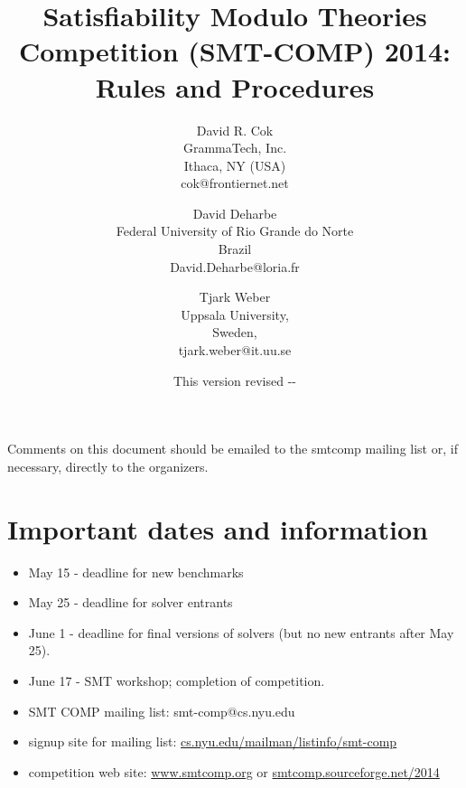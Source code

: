\documentclass[12pt]{article}
\begin{document}
\date{\small This version revised \the\year-\the\month-\the\day}

\title{Satisfiability Modulo Theories Competition (SMT-COMP) 2014: Rules and 
Procedures}


\def\doauthor#1{{%
  \hsize.5\hsize \advance\hsize by-1cm %
  \def\\{\hss\egroup\hbox to\hsize\bgroup\strut\hss}%
  \vbox{\hbox to\hsize\bgroup\strut\hss#1\hss\egroup}}}%

\def\header#1{\medskip\noindent\textbf{#1}}

\author{
David R. Cok \\
GrammaTech, Inc. \\
Ithaca, NY (USA) \\
cok@frontiernet.net \\
\and
David Deharbe \\
Federal University of Rio Grande do Norte \\
Brazil \\
David.Deharbe@loria.fr \\
\and
Tjark Weber \\
Uppsala University, \\
Sweden, \\
tjark.weber@it.uu.se \\ 
}



\maketitle

\def\eg{\textit{e.g.}}
\def\ie{\textit{i.e.}}

\noindent Comments on this document should be emailed to the smtcomp mailing
list or, if necessary, directly to the organizers.

\section{Important dates and information}
\begin{itemize}
\item May 15 - deadline for new benchmarks
\item May 25 - deadline for solver entrants
\item June 1 - deadline for final versions of solvers (but no new entrants after May 25).
\item June 17 - SMT workshop; completion of competition.
\item SMT COMP mailing list: smt-comp@cs.nyu.edu
\item signup site for mailing list: \url{cs.nyu.edu/mailman/listinfo/smt-comp}
\item competition web site: \url{www.smtcomp.org}  or \url{smtcomp.sourceforge.net/2014}
\end{itemize}
\end{document}
